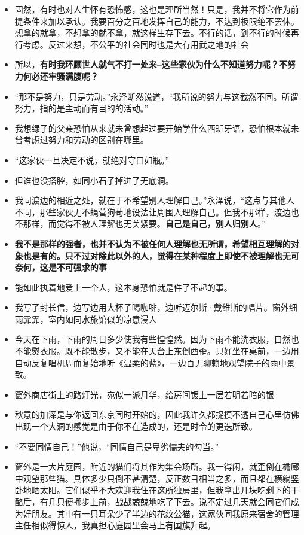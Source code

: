 \documentclass[UTF8,a4paper,8pt]{ctexbook}
\begin{document}
\begin{itemize}
		\item 固然，有时也对人生怀有恐怖感，这也是理所当然！只是，我并不将它作为前提条件来加以承认。我要百分之百地发挥自己的能力，不达到极限绝不罢休。想拿的就拿，不想拿的就不拿，就这样生存下去。不行的话，到不行的时候再行考虑。反过来想，不公平的社会同时也是大有用武之地的社会
		\item 所以，\textbf{有时我环顾世人就气不打一处来--这些家伙为什么不知道努力呢？不努力何必还牢骚满腹呢？}
		\item “那不是努力，只是劳动。”永泽断然说道，“我所说的努力与这截然不同。所谓努力，指的是主动而有目的的活动。”
		\item 我想绿子的父亲恐怕从来就未曾想起过要开始学什么西班牙语，恐怕根本就未曾考虑过努力和劳动的区别在哪里。
		\item “这家伙一旦决定不说，就绝对守口如瓶。”
		\item 但谁也没搭腔，如同小石子掉进了无底洞。
		\item 我同渡边的相近之处，就在于不希望别人理解自己。”永泽说，“这点与其他人不同，那些家伙无不蝇营狗苟地设法让周围人理解自己。但我不那样，渡边也不那样，而觉得不被人理解也无关紧要。\textbf{自己是自己，别人归别人}。”
		\item \textbf{我不是那样的强者，也并不认为不被任何人理解也无所谓，希望相互理解的对象也是有的。只不过对除此以外的人，觉得在某种程度上即使不被理解也无可奈何，这是不可强求的事}
		\item 能如此执着地爱上一个人，这本身恐怕就是件了不起的事。
		\item 我写了封长信，边写边用大杯子喝咖啡，边听迈尔斯·戴维斯的唱片。窗外细雨霏霏，室内如同水旅馆似的凉意浸人
		\item 今天在下雨，下雨的周日多少使我有些惶惶然。因为下雨不能洗衣服，自然也不能熨衣服。既不能散步，又不能在天台上东倒西歪。只好坐在桌前，一边用自动反复唱机周而复始地听《温柔的蓝》，一边百无聊赖地观望院子的雨中景致。
		\item 窗外商店街上的路灯光，宛似一派月华，给房间镀上一层若明若暗的银
		\item 秋意的加深是与你返回东京同时开始的，因此我许久都捉摸不透自己心里仿佛出现一个大洞的感觉是由于你不在造成的，还是时令的更迭所致。
		\item “不要同情自己！”他说，“同情自己是卑劣懦夫的勾当。”
		\item 窗外是一大片庭园，附近的猫们将其作为集会场所。我一得闲，就歪倒在檐廊中观望那些猫。具体多少只倒不甚清楚，反正数目相当之多，而且都在横躺竖卧地晒太阳。它们似乎不大欢迎我住在这所独房里，但我拿出几块吃剩下的干酪后，有几只便挪步上前，战战兢兢地吃了下去。说不定过几天就会同它们成为好朋友。其中有一只耳朵少了半边的花纹公猫，这家伙同我原来宿舍的管理主任相似得惊人，我真担心庭园里会马上有国旗升起。

\end{itemize}
\end{document}
